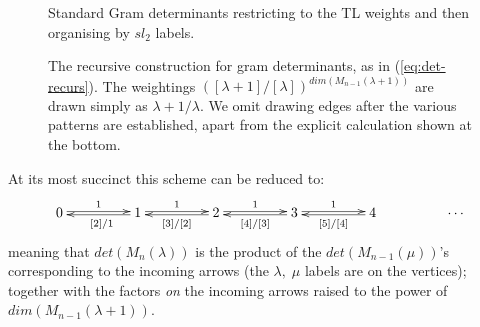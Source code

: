 \newcommand{\du}[2]{\begin{array}{c} \textcolor{red}{{#1}} \\ \hspace{-.321in}{#2}\hspace{-.321in} \end{array}}

\begin{figure}
  
  \caption{Standard Gram determinants restricting to the TL weights and then organising by $sl_2$ labels.
    \label{fig:gramdets01}}
\end{figure}


\begin{figure}
  
  \caption{The recursive construction for gram determinants, as in (\ref{eq:det-recurs}).
    The weightings
    $ ( [\lambda\!+\!1]/[\lambda] )^{dim(M_{n-1}(\lambda+1))} $
    are drawn simply as
    $\lambda\!+\!1/\lambda$. 
    We omit drawing edges after the various patterns are established,
    apart from the explicit calculation shown at the bottom. 
    \label{fig:gramdets031}}
\end{figure}


At its most succinct this scheme can be reduced to:
\[
\xymatrix@C=45pt{
  0  \ar@<.31ex>[r]^1   &
  1 \ar@<.31ex>[r]^1 \ar@<.21ex>[l]^{{{ } \;\; [2]/1}}    &
  2 \ar@<.31ex>[r]^1 \ar@<.21ex>[l]^{[3]/[2]}   &
  3 \ar@<.31ex>[r]^1 \ar@<.21ex>[l]^{[4]/[3]}  &
  4  \ar@<.21ex>[l]^{[5]/[4]}  &
  \cdots
}
\]
meaning that $det(M_n(\lambda))$ is the product of the $det(M_{n-1}(\mu))$'s
corresponding to the incoming arrows
(the $\lambda,\;\mu$ labels are on the vertices);
together with the factors {\em on}
the incoming arrows raised to the power of $dim(M_{n-1}(\lambda+1))$. 


\medskip \vspace{.5in} 

